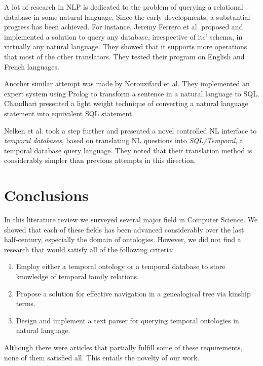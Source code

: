 A lot of research in NLP is dedicated to the problem of querying a relational database in some natural language. Since the early
developments, a substantial progress has been achieved. For instance, Jeremy Ferrero et al. proposed and implemented \cite{fr2sql}
a solution to query any database, irrespective of its' schema, in virtually any natural language. They showed that it supports
more operations that most of the other translators. They tested their program on English and French languages.

Another similar attempt was made \cite{not} by Norouzifard et al. They implemented an expert system using Prolog to transform a
sentence in a natural language to SQL. Chaudhari \cite{chaudhari} presented a light weight technique of converting a natural
language statement into equivalent SQL
statement.

Nelken et al. took \cite{nelken} a step further and presented a novel controlled NL interface to \textit{temporal databases}, based on
translating NL questions into \textit{SQL/Temporal}, a temporal database query language. They noted that their translation method
is considerably simpler than previous attempts in this direction.

\section{Conclusions}
In this literature review we surveyed several major field in Computer Science. We showed that each of these fields has been advanced
considerably over the last half-century, especially the domain of ontologies. However, we did not find a research that would
satisfy all of the following criteria:
\begin{enumerate}
    \item{Employ either a temporal ontology or a temporal database to store knowledge of temporal family relations.}
    \item{Propose a solution for effective navigation in a genealogical tree via kinship terms.}
    \item{Design and implement a text parser for querying temporal ontologies in natural language.}
\end{enumerate}
Although there were articles that partially fulfill some of these requirements, none of them satisfied all.
This entails the novelty of our work.
